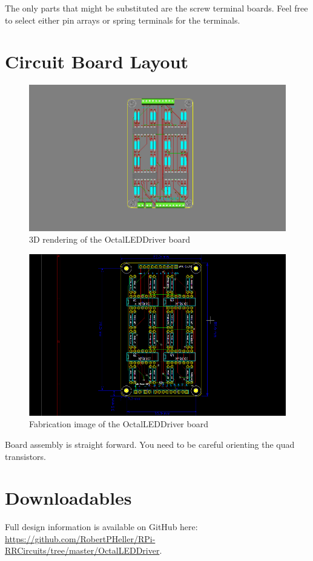 The only parts that might be substituted are the screw terminal boards. Feel 
free to select either pin arrays or spring terminals for the terminals.

\section{Circuit Board Layout}

\begin{figure}[hbpt]\begin{centering}%
\includegraphics[width=5in]{OctalLEDDriver3DTop.png}
\caption{3D rendering of the OctalLEDDriver board}
\end{centering}\end{figure}
\begin{figure}[hbpt]\begin{centering}%
\includegraphics[width=5in]{OctalLEDDriver.png}
\caption{Fabrication image of the OctalLEDDriver board}
\end{centering}\end{figure}
Board assembly is straight forward. You need to be careful orienting the quad 
transistors. 

\section{Downloadables}

Full design information is available on GitHub here:
\url{https://github.com/RobertPHeller/RPi-RRCircuits/tree/master/OctalLEDDriver}.



